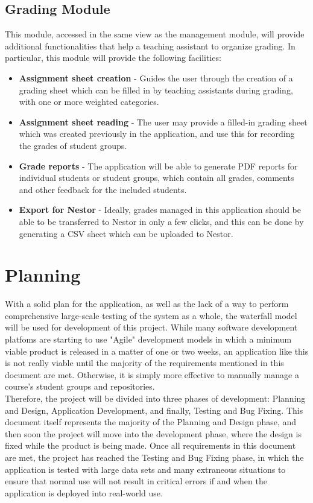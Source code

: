 \documentclass{article}
\begin{document}
	\subsection{Grading Module}
		This module, accessed in the same view as the management module, will provide additional functionalities that help a teaching assistant to organize grading. In particular, this module will provide the following facilities:
		
		\begin{itemize}
			\item \textbf{Assignment sheet creation} - Guides the user through the creation of a grading sheet which can be filled in by teaching assistants during grading, with one or more weighted categories.
			
			\item \textbf{Assignment sheet reading} - The user may provide a filled-in grading sheet which was created previously in the application, and use this for recording the grades of student groups.
			
			\item \textbf{Grade reports} - The application will be able to generate PDF reports for individual students or student groups, which contain all grades, comments and other feedback for the included students.
			
			\item \textbf{Export for Nestor} - Ideally, grades managed in this application should be able to be transferred to Nestor in only a few clicks, and this can be done by generating a CSV sheet which can be uploaded to Nestor.
		\end{itemize}

\newpage
\section{Planning}
	With a solid plan for the application, as well as the lack of a way to perform comprehensive large-scale testing of the system as a whole, the waterfall model will be used for development of this project. While many software development platfoms are starting to use "Agile" development models in which a minimum viable product is released in a matter of one or two weeks, an application like this is not really viable until the majority of the requirements mentioned in this document are met. Otherwise, it is simply more effective to manually manage a course's student groups and repositories.\\
	
	\noindent
	Therefore, the project will be divided into three phases of development: Planning and Design, Application Development, and finally, Testing and Bug Fixing. This document itself represents the majority of the Planning and Design phase, and then soon the project will move into the development phase, where the design is fixed while the product is being made. Once all requirements in this document are met, the project has reached the Testing and Bug Fixing phase, in which the application is tested with large data sets and many extraneous situations to ensure that normal use will not result in critical errors if and when the application is deployed into real-world use.
\end{document}
